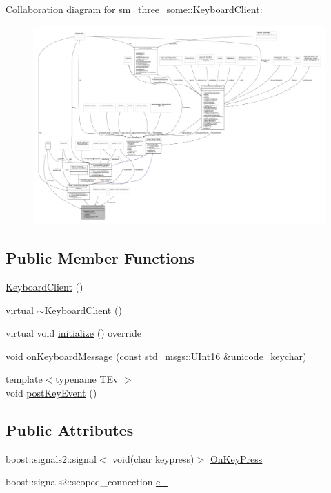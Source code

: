 Collaboration diagram for sm\+\_\+three\+\_\+some\+:\+:Keyboard\+Client\+:
\nopagebreak
\begin{figure}[H]
\begin{center}
\leavevmode
\includegraphics[width=350pt]{classsm__three__some_1_1KeyboardClient__coll__graph}
\end{center}
\end{figure}
\subsection*{Public Member Functions}
\begin{DoxyCompactItemize}
\item 
\hyperlink{classsm__three__some_1_1KeyboardClient_a8f7227b0fc8f987406ad9b3e56c6294e}{Keyboard\+Client} ()
\item 
virtual \hyperlink{classsm__three__some_1_1KeyboardClient_a0c0459f1037f4e4a99bd8bb1f4ea291b}{$\sim$\+Keyboard\+Client} ()
\item 
virtual void \hyperlink{classsm__three__some_1_1KeyboardClient_a8a74266ba37df7f09518b9689ddee828}{initialize} () override
\item 
void \hyperlink{classsm__three__some_1_1KeyboardClient_ad793e68532acd85b1e1fd17c8df827e5}{on\+Keyboard\+Message} (const std\+\_\+msgs\+::\+U\+Int16 \&unicode\+\_\+keychar)
\item 
{\footnotesize template$<$typename T\+Ev $>$ }\\void \hyperlink{classsm__three__some_1_1KeyboardClient_a3b2305afa101b892e57d40a3ca99648f}{post\+Key\+Event} ()
\end{DoxyCompactItemize}
\subsection*{Public Attributes}
\begin{DoxyCompactItemize}
\item 
boost\+::signals2\+::signal$<$ void(char keypress)$>$ \hyperlink{classsm__three__some_1_1KeyboardClient_a96b6b8220c64a1e33480d5ac75c3b8e0}{On\+Key\+Press}
\item 
boost\+::signals2\+::scoped\+\_\+connection \hyperlink{classsm__three__some_1_1KeyboardClient_aa4505f5952e5caeb9ee4e1a7d6c85d53}{c\+\_\+}
\end{DoxyCompactItemize}
